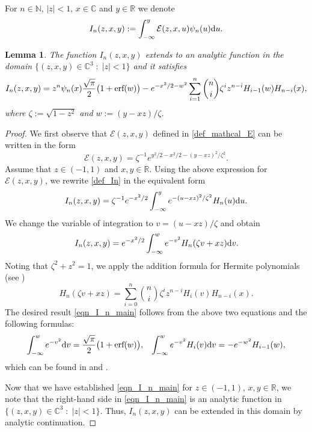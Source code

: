 \documentclass[12pt]{article}
\def\E{{\mathcal E}}
\def\r{{\mathbb R}}
\def\c{{\mathbb C}}
\def\n{{\mathbb N}}
\def\d{{\textnormal d}}
\newtheorem{lemma}{Lemma}
\begin{document}
For $n\in \n$, $|z|<1$, $x\in \c$ and $y\in \r$ we denote 
\begin{equation}\label{def_In}
I_n(z,x,y):=\int_{-\infty}^y \E(z,x,u) \psi_n(u) \d u.
\end{equation}


\begin{lemma}\label{lemma4}
The function $I_n(z,x,y)$ extends to an analytic function in the domain \mbox{$\{(z,x,y) \in \c^3 \; : \; |z|<1\}$} and it satisfies 
\begin{equation}\label{eqn_I_n_main}
I_n(z,x,y)=
 z^n \psi_n(x)  \frac{\sqrt{\pi}}{2} \big( 1+ 
{\textnormal{erf}}(w) \big)-e^{-x^2/2-w^2} \sum\limits_{i=1}^n \binom{n}{i} \zeta^{i} z^{n-i}
H_{i-1}(w) H_{n-i}(x),
\end{equation}
where $\zeta:=\sqrt{1-z^2}$ and $w:=(y-xz)/\zeta$. 
\end{lemma}
\begin{proof}
We first observe that $\E(z,x,y)$ defined in \eqref{def_mathcal_E} can be written in the form 
\begin{equation*}
\E(z,x,y)=\zeta^{-1} e^{y^2/2-x^2/2-(y-xz)^2/\zeta^2}.
\end{equation*}
Assume that $z\in (-1,1)$ and $x,y\in \r$. 
Using the above expression for $\E(z,x,y)$, we rewrite \eqref{def_In} in the equivalent form 
\[
I_n(z,x,y)=\zeta^{-1} e^{-x^2/2} \int_{-\infty}^y e^{-(u-xz)^2/\zeta^2} H_n(u) \d u. 
\]
We change the variable of integration to $v=(u-xz)/\zeta$ and obtain
\begin{equation*}
I_n(z,x,y)=e^{-x^2/2} \int_{-\infty}^w e^{-v^2} H_n(\zeta v + x z) \d v. 
\end{equation*}
Noting that $\zeta^2+z^2=1$, we apply the addition formula for Hermite polynomials (see \cite[formula 18.18.11]{NIST})
\begin{equation*}
H_n(\zeta v+xz)=\sum\limits_{i=0}^n \binom{n}{i} \zeta^i z^{n-i} 
H_i(v) H_{n-i}(x).
\end{equation*}
The desired result \eqref{eqn_I_n_main} follows from the above two equations and the following formulas:
\begin{equation}\label{two_integrals}
\int_{-\infty}^w e^{-v^2} \d v= \frac{\sqrt{\pi}}{2} \big( 1+ 
{\textnormal{erf}}(w) \big), \;\;\; \int_{-\infty}^w e^{-v^2} H_i(v) \d v=-e^{-w^2} H_{i-1}(w),
\end{equation}
which can be found in \cite[\S 7.2]{NIST}  and \cite[eqn. (7.373)]{Jeffrey2007}. 

Now that we have established \eqref{eqn_I_n_main} for $z \in (-1,1)$, $x,y\in \r$, we note that the right-hand side in \eqref{eqn_I_n_main} is an analytic function in $\{(z,x,y) \in \c^3 \; : \; |z|<1\}$. Thus, $I_n(z,x,y)$ can be extended in this domain by analytic continuation. 
\end{proof}
\end{document}
